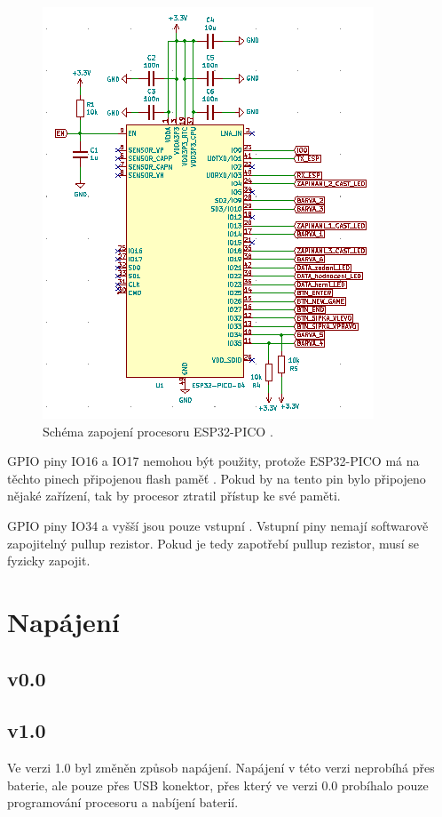   \begin{figure}[!h]
    \begin{center}
      \includegraphics[scale=1]{obrazky/ESP32_PICO_schema.png}
    \end{center}
    \caption[Schéma zapojení procesoru ESP32-PICO]{Schéma zapojení procesoru ESP32-PICO \cite{PICO_datasheet}.}
  \end{figure}

  GPIO piny IO16 a IO17 nemohou být použity, protože ESP32-PICO má na těchto pinech připojenou flash paměť \cite{PICO_datasheet}.
  Pokud by na tento pin bylo připojeno nějaké zařízení, tak by procesor ztratil přístup ke své paměti.

  GPIO piny IO34 a vyšší jsou pouze vstupní \cite{PICO_datasheet}. Vstupní piny nemají softwarově zapojitelný pullup rezistor. 
  Pokud je tedy zapotřebí pullup rezistor, musí se fyzicky zapojit.
  
  \section{Napájení}
  \subsection{v0.0}
  \subsection{v1.0}
  Ve verzi 1.0 byl změněn způsob napájení. Napájení v této verzi neprobíhá přes baterie, ale pouze přes USB konektor, přes 
  který ve verzi 0.0 probíhalo pouze programování procesoru a nabíjení baterií. 

